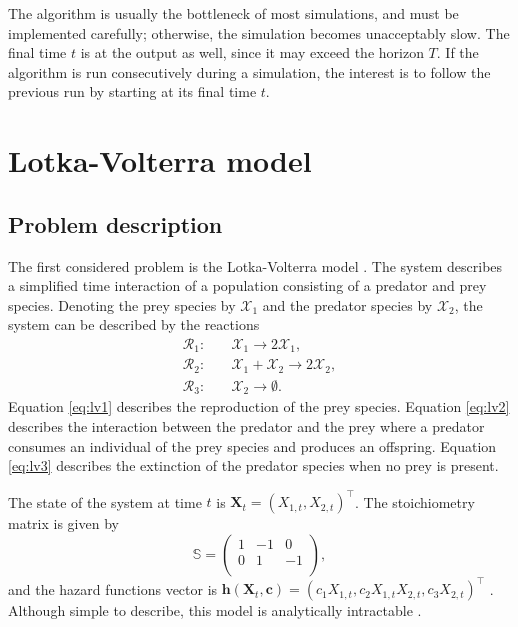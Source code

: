 The algorithm is usually the bottleneck of most simulations, and must be implemented carefully; otherwise, the simulation becomes unacceptably slow. The final time $t$ is at the output as well, since it may exceed the horizon $T$. If the algorithm is run consecutively during a simulation, the interest is to follow the previous run by starting at its final time $t$.

\section{Lotka-Volterra model} \label{sec:lotka-volterra}
\subsection{Problem description}
The first considered problem is the Lotka-Volterra model \citep{lotka, volterra}. The system describes a simplified time interaction of a population consisting of a predator and prey species. Denoting the prey species by $\mathcal{X}_1$ and the predator species by $\mathcal{X}_2$, the system can be described by the reactions
\begin{align}
\mathcal{R}_1:\quad & \mathcal{X}_1 \to 2 \mathcal{X}_1, \label{eq:lv1} \\
\mathcal{R}_2:\quad & \mathcal{X}_1 + \mathcal{X}_2 \to 2 \mathcal{X}_2, \label{eq:lv2} \\
\mathcal{R}_3:\quad & \mathcal{X}_2 \to \emptyset. \label{eq:lv3}
\end{align}
Equation \eqref{eq:lv1} describes the reproduction of the prey species. Equation \eqref{eq:lv2} describes the interaction between the predator and the prey where a predator consumes an individual of the prey species and produces an offspring. Equation \eqref{eq:lv3} describes the extinction of the predator species when no prey is present.

The state of the system at time $t$ is $\bm{X}_t = \left(X_{1,t}, X_{2,t}\right)^\intercal$. The stoichiometry matrix is given by
\begin{equation*}
\mathbb{S} = \begin{pmatrix}
1 & -1 & 0 \\
0 & 1 & -1 \\
\end{pmatrix},
\end{equation*}
and the hazard functions vector is $\bm{h}(\bm{X}_t, \bm{c}) = \left(c_1 X_{1,t}, c_2 X_{1,t} X_{2,t}, c_3 X_{2,t}\right)^\intercal$ \citep{wilkinson}. Although simple to describe, this model is analytically intractable \citep{wilkinson-book}.

